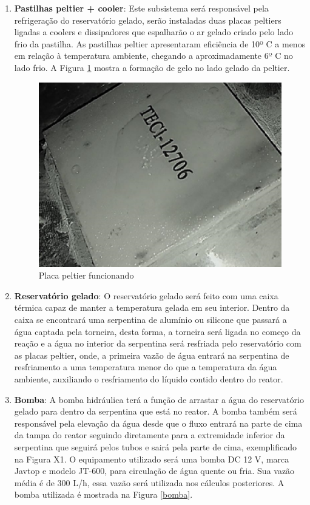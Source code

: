 \begin{enumerate}
	\item \textbf{Pastilhas peltier + cooler}: Este subsistema será responsável pela refrigeração do reservatório gelado, serão instaladas duas placas peltiers ligadas a coolers e dissipadores que espalharão o ar gelado criado pelo lado frio da pastilha. As pastilhas peltier apresentaram eficiência de 10º C a menos em relação à temperatura ambiente, chegando a aproximadamente 6º C no lado frio. A Figura \ref{placa} mostra a formação de gelo no lado gelado da peltier.

	\begin{figure}[h]
	 \centering
	 \includegraphics[keepaspectratio=true,scale=0.5]{figuras/placa.eps}
	 \caption{Placa peltier funcionando}
	 \label{placa}
	\end{figure}

	\item \textbf{Reservatório gelado}:	O reservatório gelado será feito com uma caixa térmica capaz de manter a temperatura gelada em seu interior. Dentro da caixa se encontrará uma serpentina de alumínio ou silicone que passará a água captada pela torneira, desta forma, a torneira será ligada no começo da reação e a água no interior da serpentina será resfriada pelo reservatório com as placas peltier, onde, a primeira vazão de água entrará na serpentina de resfriamento a uma temperatura menor do que a temperatura da água ambiente, auxiliando o resfriamento do líquido contido dentro do reator.

	\item \textbf{Bomba}: A bomba hidráulica terá a função de arrastar a água do reservatório gelado para dentro da serpentina que está no reator. A bomba também será responsável pela elevação da água desde que o fluxo entrará na parte de cima da tampa do reator seguindo diretamente para a extremidade inferior da serpentina que seguirá pelos tubos e sairá pela parte de cima, exemplificado na Figura X1. O equipamento utilizado será uma bomba DC 12 V, marca Javtop e modelo JT-600, para circulação de água quente ou fria. Sua vazão média é de 300 L/h, essa vazão será utilizada nos cálculos posteriores. A bomba utilizada é mostrada na Figura \ref{bomba}.


\end{enumerate}

